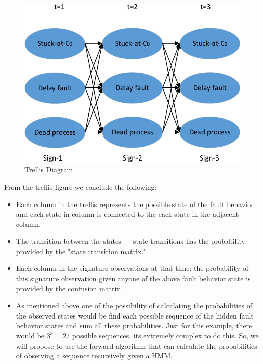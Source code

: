 \begin{figure}[tb!]

 \centering
  \captionsetup{justification=centering}    
   \includegraphics[scale=0.8]{Figures/viterbi.pdf}
   \caption{Trellis Diagram}
\label{fig:trellis}
\end{figure}


From the trellis figure we conclude the following:

\begin{itemize}

\item Each column in the trellis represents the possible state of the fault behavior and each state in column is connected to the each state in the adjacent column.

\item The transition between the states --- state transitions has the probability provided by the "state transition matrix."

\item Each column in the signature observations at that time: the probability of this signature observation given anyone of the above fault behavior state is provided by the confusion matrix. 

\item As mentioned above one of the possibility of calculating the probabilities of the observed states would be find each possible sequence of the hidden fault behavior states and sum all these probabilities. Just for this example, there would be $3^3 = 27$ possible sequences, its extremely complex to do this. So, we will propose to use the forward algorithm that can calculate the probabilities of observing a sequence recursively given a HMM.

\end{itemize}

